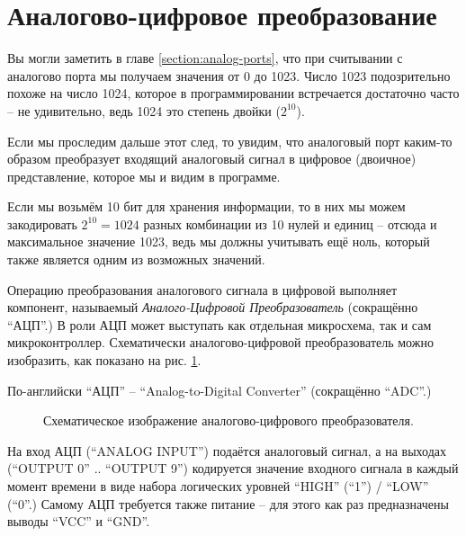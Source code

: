 \documentclass[../sparc.tex]{subfiles}
\begin{document}
\section{Аналогово-цифровое преобразование}

Вы могли заметить в главе \ref{section:analog-ports}, что при считывании с
аналогово порта мы получаем значения от 0 до 1023.  Число 1023 подозрительно
похоже на число 1024, которое в программировании встречается достаточно часто --
не удивительно, ведь 1024 это степень двойки ($2^{10}$).

Если мы проследим дальше этот след, то увидим, что аналоговый порт каким-то
образом преобразует входящий аналоговый сигнал в цифровое (двоичное)
представление, которое мы и видим в программе.

Если мы возьмём 10 бит для хранения информации, то в них мы можем закодировать
$2^{10} = 1024$ разных комбинации из 10 нулей и единиц -- отсюда и максимальное
значение 1023, ведь мы должны учитывать ещё ноль, который также является одним
из возможных значений.

Операцию преобразования аналогового сигнала в цифровой выполняет компонент,
называемый \emph{Аналого-Цифровой Преобразователь} (сокращённо ``АЦП''.)  В роли
АЦП может выступать как отдельная микросхема, так и сам микроконтроллер.
Схематически аналогово-цифровой преобразователь можно изобразить, как показано
на рис. \ref{fig:adc-schematics}.

По-английски ``АЦП'' -- ``Analog-to-Digital Converter'' (сокращённо ``ADC''.)

\begin{figure}[ht]
  \centering
  \caption{Схематическое изображение аналогово-цифрового преобразователя.}
  \label{fig:adc-schematics}
\end{figure}

На вход АЦП (``ANALOG INPUT'') подаётся аналоговый сигнал, а на выходах
(``OUTPUT 0'' .. ``OUTPUT 9'') кодируется значение входного сигнала в каждый
момент времени в виде набора логических уровней ``HIGH'' (``1'') / ``LOW''
(``0''.)  Самому АЦП требуется также питание -- для этого как раз предназначены
выводы ``VCC'' и ``GND''.
\end{document}
